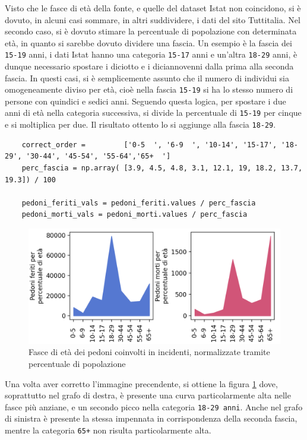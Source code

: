 \documentclass[a4paper,12pt]{report}
\newcommand{\columnstyle}[1]{\texttt{#1}}
\begin{document}
Visto che le fasce di età della fonte, e quelle del dataset Istat non coincidono, 
si è dovuto, in alcuni casi sommare, in altri suddividere, i dati del sito Tuttitalia.
Nel secondo caso, si è dovuto stimare la percentuale di popolazione con 
determinata età, in quanto si sarebbe dovuto dividere una fascia.
Un esempio è la fascia dei \columnstyle{15-19} anni, 
i dati Istat hanno una categoria \columnstyle{15-17} anni e un'altra 
\columnstyle{18-29} anni, 
è dunque necessario spostare i diciotto e i diciannovenni dalla prima alla 
seconda fascia. 
In questi casi, si è semplicemente assunto che il numero di individui sia omogeneamente 
diviso per età, cioè nella fascia \columnstyle{15-19} si ha lo stesso numero di 
persone con quindici e sedici anni.
Seguendo questa logica, per spostare i due anni di età nella categoria successiva, 
si divide la percentuale di \columnstyle{15-19} per cinque e si moltiplica per due. 
Il risultato ottento lo si aggiunge alla fascia \columnstyle{18-29}.

\begin{lstlisting}
    correct_order =         ['0-5  ', '6-9  ', '10-14', '15-17', '18-29', '30-44', '45-54', '55-64','65+  ']
    perc_fascia = np.array( [3.9, 4.5, 4.8, 3.1, 12.1, 19, 18.2, 13.7, 19.3]) / 100

    pedoni_feriti_vals = pedoni_feriti.values / perc_fascia
    pedoni_morti_vals = pedoni_morti.values / perc_fascia
\end{lstlisting}

\begin{figure}
    \includegraphics[width=\linewidth]{../src/incidenti/incidenti_senza_coords/pedoni/eta_pedoni_norm.png}
    \caption{Fasce di età dei pedoni coinvolti in incidenti, normalizzate tramite percentuale di popolazione}
    \label{fig:eta-pedoni-norm}
\end{figure}

Una volta aver corretto l'immagine precendente, 
si ottiene la figura \ref{fig:eta-pedoni-norm} dove, soprattutto 
nel grafo di destra, è presente una curva particolarmente alta 
nelle fasce più anziane, e un secondo picco nella categoria \columnstyle{18-29 anni}.
Anche nel grafo di sinistra è presente la stessa impennata in corrispondenza 
della seconda fascia, mentre la categoria \columnstyle{65+} non 
risulta particolarmente alta.
\end{document}
